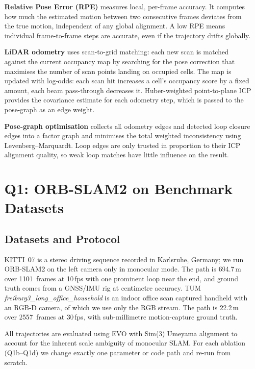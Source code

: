 \documentclass[twocolumn,10pt,a4paper]{article}
\begin{document}
\textbf{Relative Pose Error (RPE)} measures local, per-frame accuracy. It computes how much the estimated motion between two consecutive frames deviates from the true motion, independent of any global alignment. A low RPE means individual frame-to-frame steps are accurate, even if the trajectory drifts globally.

\textbf{LiDAR odometry} uses scan-to-grid matching: each new scan is matched against the current occupancy map by searching for the pose correction that maximises the number of scan points landing on occupied cells. The map is updated with log-odds: each scan hit increases a cell's occupancy score by a fixed amount, each beam pass-through decreases it. Huber-weighted point-to-plane ICP provides the covariance estimate for each odometry step, which is passed to the pose-graph as an edge weight.

\textbf{Pose-graph optimisation} collects all odometry edges and detected loop closure edges into a factor graph and minimises the total weighted inconsistency using Levenberg--Marquardt. Loop edges are only trusted in proportion to their ICP alignment quality, so weak loop matches have little influence on the result.

\section{Q1: ORB-SLAM2 on Benchmark Datasets}
\label{sec:q1}

\subsection*{Datasets and Protocol}

KITTI~07 is a stereo driving sequence recorded in Karlsruhe, Germany; we run ORB-SLAM2 on the left camera only in monocular mode. The path is 694.7\,m over 1101~frames at 10\,fps with one prominent loop near the end, and ground truth comes from a GNSS/IMU rig at centimetre accuracy. TUM \textit{freiburg3\_long\_office\_household} is an indoor office scan captured handheld with an RGB-D camera, of which we use only the RGB stream. The path is 22.2\,m over 2557~frames at 30\,fps, with sub-millimetre motion-capture ground truth.

All trajectories are evaluated using EVO with Sim(3) Umeyama alignment to account for the inherent scale ambiguity of monocular SLAM. For each ablation (Q1b--Q1d) we change exactly one parameter or code path and re-run from scratch.
\end{document}
